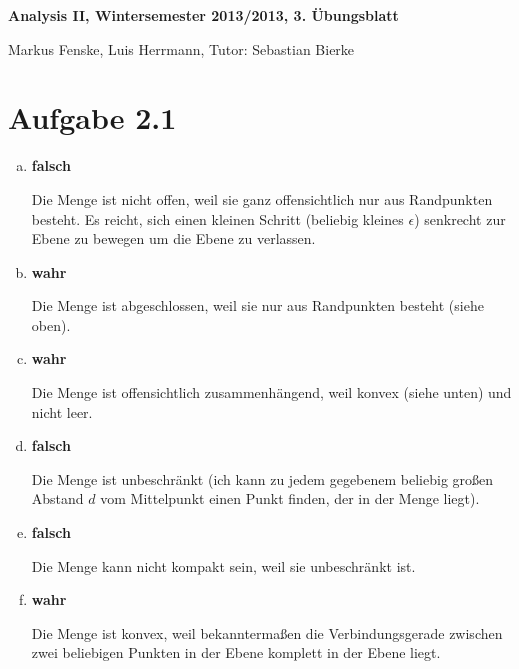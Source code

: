 \documentclass[a4paper,german,12pt,smallheadings]{scrartcl}
\begin{document}
\begin{center}
\bfseries %
\sffamily %
\vspace{-40pt}
Analysis II, Wintersemester 2013/2013, 3. Übungsblatt

Markus Fenske, Luis Herrmann, Tutor: Sebastian Bierke
\vspace{-10pt}
\end{center}

\section*{Aufgabe 2.1}
\begin{enumerate}[a)]
  \item
    \textbf{falsch}

    Die Menge ist nicht offen, weil sie ganz offensichtlich nur aus Randpunkten
    besteht. Es reicht, sich einen kleinen Schritt (beliebig kleines
    $\epsilon$) senkrecht zur Ebene zu bewegen um die Ebene zu verlassen.
  \item
    \textbf{wahr}

    Die Menge ist abgeschlossen, weil sie nur aus Randpunkten besteht (siehe
    oben).
  \item
    \textbf{wahr}

    Die Menge ist offensichtlich zusammenhängend, weil konvex (siehe unten) und
    nicht leer.

  \item
    \textbf{falsch}

    Die Menge ist unbeschränkt (ich kann zu jedem gegebenem beliebig großen
    Abstand $d$ vom Mittelpunkt einen Punkt finden, der in der Menge liegt).

  \item
    \textbf{falsch}

    Die Menge kann nicht kompakt sein, weil sie unbeschränkt ist.
  \item
    \textbf{wahr}

    Die Menge ist konvex, weil bekanntermaßen die Verbindungsgerade zwischen
    zwei beliebigen Punkten in der Ebene komplett in der Ebene liegt.
\end{enumerate}
\end{document}
